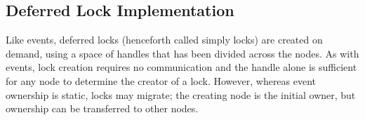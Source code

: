 

\subsection{Deferred Lock Implementation}
\label{subsec:lockimpl}

Like events, deferred locks (henceforth called simply locks) are
created on demand, using a space of handles that has been divided
across the nodes.  As with events, lock creation requires no communication
and the handle alone is sufficient for any node to determine the creator
of a lock.  However, whereas event ownership is static, locks may migrate; the
creating node is the initial owner, but ownership can be
transferred to other nodes.


